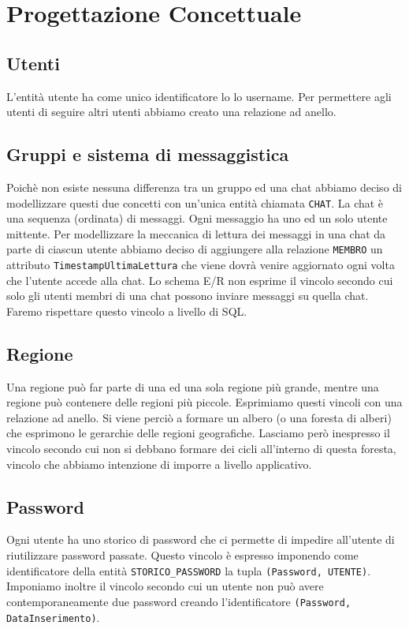 \documentclass[a4paper,12pt]{report}
\begin{document}
\chapter{Progettazione Concettuale}
\section{Utenti}
L'entità utente ha come unico identificatore lo lo username. Per permettere agli utenti di seguire altri utenti abbiamo creato una relazione ad anello.
\section{Gruppi e sistema di messaggistica}
Poichè non esiste nessuna differenza tra un gruppo ed una chat abbiamo deciso di modellizzare questi due concetti con un'unica entità chiamata \texttt{CHAT}. La chat è una sequenza (ordinata) di messaggi. Ogni messaggio ha uno ed un solo utente mittente. Per modellizzare la meccanica di lettura dei messaggi in una chat da parte di ciascun utente abbiamo deciso di aggiungere alla relazione \texttt{MEMBRO} un attributo \texttt{TimestampUltimaLettura} che viene dovrà venire aggiornato ogni volta che l'utente accede alla chat. Lo schema E/R non esprime il vincolo secondo cui solo gli utenti membri di una chat possono inviare messaggi su quella chat. Faremo rispettare questo vincolo a livello di SQL.
\section{Regione}
Una regione può far parte di una ed una sola regione più grande, mentre una regione può contenere delle regioni più piccole. Esprimiamo questi vincoli con una relazione ad anello. Si viene perciò a formare un albero (o una foresta di alberi) che esprimono le gerarchie delle regioni geografiche. Lasciamo però inespresso il vincolo secondo cui non si debbano formare dei cicli all'interno di questa foresta, vincolo che abbiamo intenzione di imporre a livello applicativo. 
\section{Password}
Ogni utente ha uno storico di password che ci permette di impedire all'utente di riutilizzare password passate. Questo vincolo è espresso imponendo come identificatore della entità \texttt{STORICO\_PASSWORD} la tupla \texttt{(Password, UTENTE)}. Imponiamo inoltre il vincolo secondo cui un utente non può avere contemporaneamente due password creando l'identificatore \texttt{(Password, DataInserimento)}.
\end{document}
